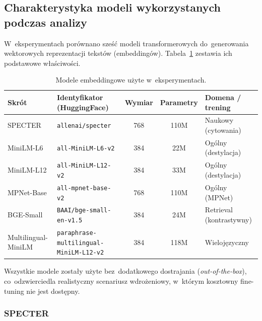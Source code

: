 \subsection{Charakterystyka modeli wykorzystanych podczas analizy}
\label{subsec:models_overview}

W~eksperymentach porównano sześć modeli transformerowych
do~generowania wektorowych reprezentacji tekstów (embeddingów).
Tabela~\ref{tab:models_full} zestawia ich podstawowe właściwości.

\begin{table}[H]
\centering
\caption{Modele embeddingowe użyte w~eksperymentach.}
\label{tab:models_full}
\begin{tabular}{llccp{3.2cm}}
\toprule
\textbf{Skrót} & \textbf{Identyfikator (HuggingFace)} & \textbf{Wymiar} & \textbf{Parametry} & \textbf{Domena / trening} \\
\midrule
SPECTER            & \texttt{allenai/specter}                        & 768 & 110M & Naukowy (cytowania) \\
MiniLM-L6          & \texttt{all-MiniLM-L6-v2}                       & 384 & 22M  & Ogólny (destylacja) \\
MiniLM-L12         & \texttt{all-MiniLM-L12-v2}                      & 384 & 33M  & Ogólny (destylacja) \\
MPNet-Base         & \texttt{all-mpnet-base-v2}                      & 768 & 110M & Ogólny (MPNet) \\
BGE-Small          & \texttt{BAAI/bge-small-en-v1.5}                 & 384 & 24M  & Retrieval (kontrastywny) \\
Multilingual-MiniLM & \texttt{paraphrase-multilingual-MiniLM-L12-v2} & 384 & 118M & Wielojęzyczny \\
\bottomrule
\end{tabular}
\end{table}

Wszystkie modele zostały użyte bez~dodatkowego dostrajania (\textit{out-of-the-box}),
co~odzwierciedla realistyczny scenariusz wdrożeniowy, w~którym kosztowny
fine-tuning nie jest dostępny.

\subsubsection{SPECTER}

